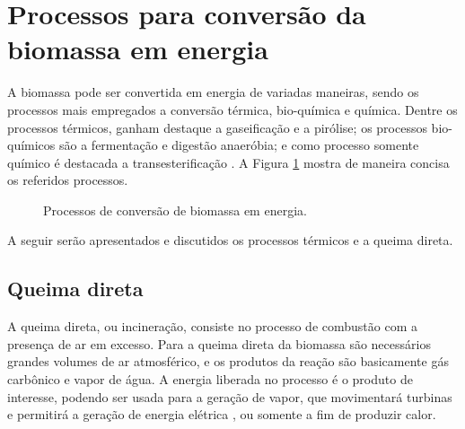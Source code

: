 \section{Processos para conversão da biomassa em energia}
A biomassa pode ser convertida em energia de variadas maneiras, sendo os processos mais empregados a conversão térmica, bio-química e química. Dentre os processos térmicos, ganham destaque a gaseificação e a pirólise; os processos bio-químicos são a fermentação e digestão anaeróbia; e como processo somente químico é destacada a transesterificação \cite{Singh}. A Figura \ref{fig:Pic_biomass} mostra de maneira concisa os referidos processos.

\begin{figure}[!ht]
	\centering
	\caption{Processos de conversão de biomassa em energia.}
	\label{fig:Pic_biomass}
\end{figure}

A seguir serão apresentados e discutidos os processos térmicos e a queima direta. 

\subsection{Queima direta}
A queima direta, ou incineração, consiste no processo de combustão com a presença de ar em excesso. Para a queima direta da biomassa são necessários grandes volumes de ar atmosférico, e os produtos da reação são basicamente gás carbônico e vapor de água. A energia liberada no processo é o produto de interesse, podendo ser usada para a geração de vapor, que movimentará turbinas e permitirá a geração de energia elétrica \cite{Kretti}, ou somente a fim de produzir calor.

